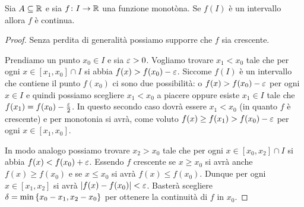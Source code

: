   
  \begin{theorem}
    \label{th:monotona_continua}%
    \mymark{*}%
    Sia $A\subseteq {\mathbb R}$ e sia
    $f\colon I \to {\mathbb R}$ una funzione monotòna.
    Se $f(I)$ è un intervallo allora $f$ è continua.
\end{theorem}
  \begin{proof}
  Senza perdita di generalità possiamo supporre che $f$ 
  sia crescente. 
  
  Prendiamo un punto $x_0\in I$ e sia $\varepsilon>0$.
  Vogliamo trovare $x_1<x_0$ tale che  
  per ogni $x\in [x_1,x_0]\cap I$ si abbia $f(x)>f(x_0)-\varepsilon$.
  Siccome $f(I)$ è un intervallo che contiene il punto $f(x_0)$ 
  ci sono due possibilità: o $f(x)>f(x_0)-\varepsilon$ per ogni $x\in I$
  e quindi possiamo scegliere $x_1<x_0$ a piacere
  oppure esiste $x_1\in I$ tale che $f(x_1)=f(x_0) - \frac {\varepsilon} 2$.
  In questo secondo caso dovrà essere $x_1<x_0$ (in quanto $f$ è crescente)
  e per monotonia si avrà, come voluto $f(x)\ge f(x_1) > f(x_0)-\varepsilon$ 
  per ogni $x\in [x_1,x_0]$.
  
  In modo analogo possiamo trovare $x_2>x_0$ tale 
  che per ogni $x\in [x_0,x_2]\cap I$ si abbia $f(x) < f(x_0)+\varepsilon$.
  Essendo $f$ crescente se $x\ge x_0$ si avrà anche $f(x)\ge f(x_0)$ 
  e se $x\le x_0$ si avrà $f(x) \le f(x_0)$. 
  Dunque per ogni $x\in [x_1,x_2]$ si avrà ${\left|f(x)-f(x_0)\right|}<\varepsilon$.
  Basterà scegliere $\delta = \min{\left\{ x_0-x_1,x_2-x_0 \right\}}$ 
  per ottenere la continuità di $f$ in $x_0$.
  

\end{proof}
